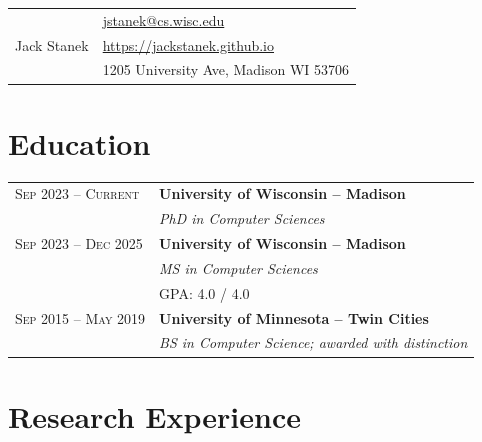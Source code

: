 \documentclass{article} %
\begin{document}
\pagestyle{empty} %

\noindent %
\begin{tabular}{@{}l @{\hspace{2em}} | l @{\extracolsep{\fill}}}
\multirow{3}{*}{\Huge Jack Stanek}
    & \href{mailto:jstanek@cs.wisc.edu}{jstanek@cs.wisc.edu} \\
    & \href{https://jackstanek.github.io}{https://jackstanek.github.io} \\
    & 1205 University Ave, Madison WI 53706 \\
\end{tabular}



\section{Education}

\begin{tabular}{R{4cm}p{11cm}}
    \textsc{Sep 2023 -- Current} & \textbf{University of Wisconsin -- Madison} \\
    & \emph{PhD in Computer Sciences} \\
    \textsc{Sep 2023 -- Dec 2025} & \textbf{University of Wisconsin -- Madison} \\
    & \emph{MS in Computer Sciences} \\
    & GPA: 4.0 / 4.0 \\
    \textsc{Sep 2015 -- May 2019} & \textbf{University of Minnesota -- Twin Cities} \\
    & \emph{BS in Computer Science; awarded with distinction} \\
\end{tabular}


\section{Research Experience}
\end{document}
